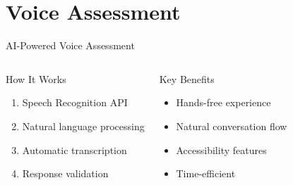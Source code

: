 \documentclass[aspectratio=169]{beamer}
\begin{document}
\section{Voice Assessment}
\begin{frame}{AI-Powered Voice Assessment}
    \begin{columns}[T]
        \begin{block}{How It Works}
            \begin{enumerate}
                \item \textcolor{googleblue}{Speech Recognition API}
                \item \textcolor{googlegreen}{Natural language processing}
                \item \textcolor{googlered}{Automatic transcription}
                \item \textcolor{googleyellow}{Response validation}
            \end{enumerate}
        \end{block}
        
        \begin{alertblock}{Key Benefits}
            \begin{itemize}
                \item Hands-free experience
                \item Natural conversation flow
                \item Accessibility features
                \item Time-efficient
            \end{itemize}
        \end{alertblock}
        
        \begin{center}
        \end{center}
    \end{columns}
\end{frame}
\end{document}
